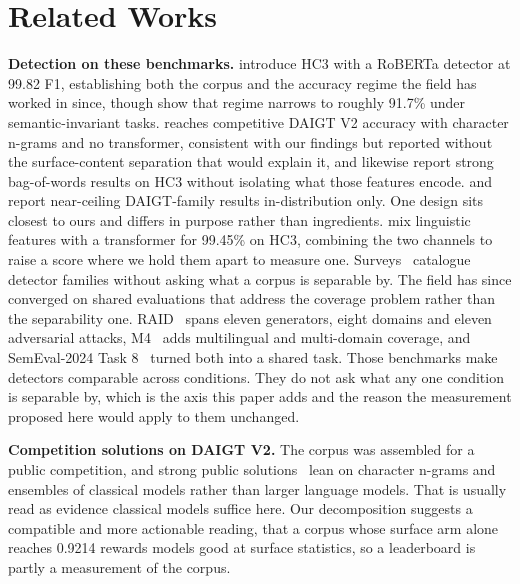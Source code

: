\section{Related Works}
\label{sec:related}

\textbf{Detection on these benchmarks.} \citet{Guo2023close} introduce HC3 with a RoBERTa detector at 99.82 F1, establishing both the corpus and the accuracy regime the field has worked in since, though \citet{Su2023plus} show that regime narrows to roughly 91.7\% under semantic-invariant tasks. \citet{Zhou2024exploiting} reaches competitive DAIGT V2 accuracy with character n-grams and no transformer, consistent with our findings but reported without the surface-content separation that would explain it, and \citet{Kubrusly2025detecting} likewise report strong bag-of-words results on HC3 without isolating what those features encode. \citet{Ansary2026multirepresentation} and \citet{Lamsiyah2025daigt} report near-ceiling DAIGT-family results in-distribution only. One design sits closest to ours and differs in purpose rather than ingredients. \citet{Annepaka2026synergizing} mix linguistic features with a transformer for 99.45\% on HC3, combining the two channels to raise a score where we hold them apart to measure one. Surveys~\cite{Crothers2023machine} catalogue detector families without asking what a corpus is separable by. The field has since converged on shared evaluations that address the coverage problem rather than the separability one. RAID~\cite{Dugan2024raid} spans eleven generators, eight domains and eleven adversarial attacks, M4~\cite{Wang2024m4} adds multilingual and multi-domain coverage, and SemEval-2024 Task 8~\cite{Wang2024semeval} turned both into a shared task. Those benchmarks make detectors comparable across conditions. They do not ask what any one condition is separable by, which is the axis this paper adds and the reason the measurement proposed here would apply to them unchanged.

\textbf{Competition solutions on DAIGT V2.} The corpus was assembled for a public competition, and strong public solutions~\cite{Zain2025multi} lean on character n-grams and ensembles of classical models rather than larger language models. That is usually read as evidence classical models suffice here. Our decomposition suggests a compatible and more actionable reading, that a corpus whose surface arm alone reaches 0.9214 rewards models good at surface statistics, so a leaderboard is partly a measurement of the corpus.


